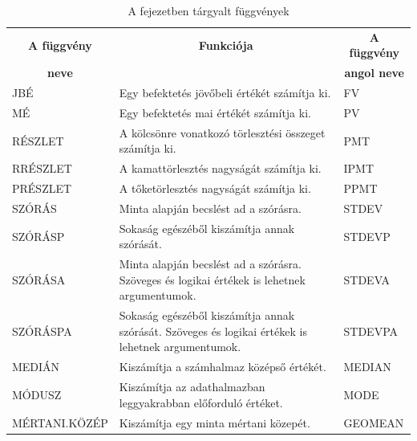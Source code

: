 \begin{table}[!h]
\begin{center}
\caption{A fejezetben tárgyalt függvények}\label{15-fejezetFüggvények}
\begin{tabular}{|m{3cm}|m{8cm}|m{3.5cm}|}
\hline
\multicolumn{1}{|c|}{\textbf{A függvény}}&
\multicolumn{1}{c|}{\textbf{Funkciója}}&
\multicolumn{1}{c|}{\textbf{A függvény}} \\
\multicolumn{1}{|c|}{\textbf{neve}} & &
\multicolumn{1}{c|}{\textbf{angol neve}} \\
\hline
JBÉ & Egy befektetés jövőbeli értékét számítja ki. & FV\\ \hline
MÉ & Egy befektetés mai értékét számítja ki. & PV\\ \hline
RÉSZLET & A kölcsönre vonatkozó törlesztési összeget számítja ki. &
PMT\\ \hline
RRÉSZLET & A kamattörlesztés nagyságát számítja ki. & IPMT\\ \hline
PRÉSZLET & A tőketörlesztés nagyságát számítja ki. & PPMT\\ \hline
SZÓRÁS & Minta alapján becslést ad a szórásra. & STDEV\\ \hline
SZÓRÁSP & Sokaság egészéből kiszámítja annak szórását. & STDEVP\\ \hline
SZÓRÁSA & Minta alapján becslést ad a szórásra. Szöveges és logikai
értékek is lehetnek argumentumok. & STDEVA\\ \hline
SZÓRÁSPA & Sokaság egészéből kiszámítja annak szórását.
Szöveges és logikai értékek is lehetnek argumentumok. & STDEVPA\\ \hline
MEDIÁN & Kiszámítja a számhalmaz középső értékét. & MEDIAN\\ \hline
MÓDUSZ & Kiszámítja az adathalmazban leggyakrabban előforduló
értéket. & MODE\\ \hline
MÉRTANI.KÖZÉP & Kiszámítja egy minta mértani közepét. & GEOMEAN\\ \hline
\end{tabular}
\end{center}
\end{table}

